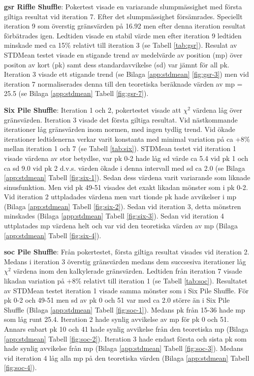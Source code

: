 \documentclass[swedish,a4paper]{article}
\begin{document}
\textbf{\gls{gsr} Riffle Shuffle}:  Pokertest visade en variarande slumpmässighet
med första giltiga resultat vid iteration 7. Efter det slumpmässighet
försämrades.
Speciellt iteration 9 som överstig gränsvärden på 16.92 men efter denna iteration
resultat förbätrades igen. Ledtiden visade en stabil värde men efter iteration 9
ledtiden minskade med ca 15\% relativt till iteration 3 (se Tabell
\ref{tab:gsr}).
Resulat av STDMean testet visade en stigande trend av medelvärde av position
(\gls{mp}) över positon av kort (\gls{pk}) samt dess standardavvikelse
(\gls{sd}) var jämnt för all \gls{pk}. Iteration 3 visade ett stigande trend (se
Bilaga \ref{app:stdmean} \ref{fig:gsr-3}) men vid iteration 7 normaliserades denna
till den teoretiska beräknade värden av \gls{mp} = 25.5 (se Bilaga
\ref{app:stdmean} Tabell \ref{fig:gsr-7}). 

\textbf{Six Pile Shuffle}: Iteration 1 och 2, pokertestet visade att $\chi^2$
värdena låg över gränsvärden. Iteration 3 visade det första giltiga resultat.
Vid nästkommande iterationer låg gränsvärden inom normen, med ingen
tydlig trend. Vid ökade iterationer  ledtidenerna verkar varit konstanta med
minimal variation på ca +8\% mellan iteration 1 och 7 (se Tabell \ref{tab:six}).
STDMean testet vid iteration 1 visade värdena av stor betydlse, var \gls{pk} 0-2
hade låg \gls{sd} värde ca 5.4 vid \gls{pk} 1 och ca \gls{sd} 9.0 vid \gls{pk} 2
d.v.s. värden ökade i denna intervall med \gls{sd} ca 2.0
(se Bilaga \ref{app:stdmean} Tabell  \ref{fig:six-1}).
Sedan dess värdena varit variarande som liknade sinusfunktion. Men vid \gls{pk}
49-51 visades det exakt likadan mönster som i \gls{pk} 0-2. Vid iteration 2 uttpladades
värdena men vart tionde \gls{pk} hade avvikelser i \gls{mp} 
(Bilaga \ref{app:stdmean} Tabell  \ref{fig:six-2}). Sedan vid iteration 3, detta
mönstren minskades (Bilaga \ref{app:stdmean} Tabell \ref{fig:six-3}).
Sedan vid iteration 4 uttplatades \gls{mp} värdena helt och var
vid den teoretiska värden av \gls{mp} (Bilaga \ref{app:stdmean} Tabell \ref{fig:six-4}).

\textbf{\gls{soc} Pile Shuffle}: Från pokertestet, första giltiga resultat
visades vid iteration 2. Medans i iteration 3 överstig gränsvärden medans dem
succsesiva iterationer låg $\chi^2$ värdena inom den kalkylerade gränsvärden.
Ledtiden från iteration 7 visade likadan  variation på +8\% relativt till
iteration 1 (se Tabell \ref{tab:soc}). Resultatet av STDMean testet iteration 1
visade samma mönster som i Six Pile Shuffle. För \gls{pk} 0-2 och 49-51 men
\gls{sd} av \gls{pk} 0 och 51 var med ca 2.0 större än i Six Pile Shuffle
(Bilaga \ref{app:stdmean} Tabell \ref{fig:soc-1}). Medans \gls{pk} från 15-36
hade \gls{mp} som låg runt 25.4. Iteration 2 hade synlig avvikelse av \gls{mp}
för \gls{pk} 0 och 51. Annars enbart \gls{pk} 10 och 41 hade synlig avvikelse
från den teoretiska \gls{mp} (Bilaga \ref{app:stdmean} Tabell \ref{fig:soc-2}).
Iteration 3 hade endast första och sista \gls{pk} som hade synlig avvikelse från
\gls{mp} (Bilaga \ref{app:stdmean} Tabell \ref{fig:soc-3}). Medans vid iteration
4 låg alla \gls{mp} på den teoretiska värden (Bilaga \ref{app:stdmean} Tabell
\ref{fig:soc-4}).
\end{document}
